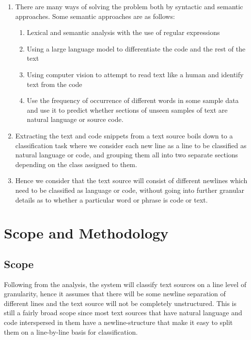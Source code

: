 \documentclass[12pt]{scrreprt}
\begin{document}
\begin{enumerate}
    \item There are many ways of solving the problem both by syntactic and semantic approaches. Some semantic approaches are as follows:
        \begin{enumerate}
            \item Lexical and semantic analysis with the use of regular expressions
            \item Using a large language model to differentiate the code and the rest of the text 
            \item Using computer vision to attempt to read text like a human and identify text from the code
            \item Use the frequency of occurrence of different words in some sample data and use it to predict whether sections of unseen samples of text are natural language or source code. 
        \end{enumerate}
    \item Extracting the text and code snippets from a text source boils down to a classification task where we consider each new line as a line to be classified as natural language or code, and grouping them all into two separate sections depending on the class assigned to them.
    \item Hence we consider that the text source will consist of different newlines which need to be classified as language or code, without going into further granular details as to whether a particular word or phrase is code or text.
    

\end{enumerate}






\chapter{Scope and Methodology}

\section{Scope}
Following from the analysis, the system will classify text sources on a line level of granularity, hence it assumes that there will be some newline separation of different lines and the text source will not be completely unstructured. This is still a fairly broad scope since most text sources that have natural language and code interspersed in them have a newline-structure that make it easy to split them on a line-by-line basis for classification. 
\end{document}
